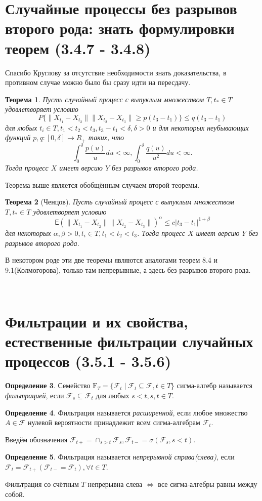 \documentclass[16pt]{article}
\newtheorem{theorem}{Теорема}[section]
\theoremstyle{definition}
\newtheorem{definition}[theorem]{Определение}
\begin{document}
\section{Случайные процессы без разрывов второго рода: знать формулировки теорем (3.4.7
- 3.4.8)}
Спасибо Круглову за отсутствие необходимости знать доказательства, в противном случае можно было бы сразу идти на пересдачу. 
\begin{theorem}
Пусть случайный процесс с выпуклым множеством $T, t_* \in T$ удовлетворяет условию $$P\{\|X_{t_1} - X_{t_2}\|\|X_{t_2} - X_{t_3}\| \ge p(t_3 - t_1)\} \le q(t_3 - t_1)$$ для любых $t_i \in T, t_1 < t_2 < t_3, t_3 - t_1 < \delta, \delta > 0$ и для некоторых неубывающих функций $p,q: [0, \delta] \rightarrow R_+$ таких, что $$\int_0^\delta \frac{p(u)}{u} du < \infty, \int_0^\delta \frac{q(u)}{u^2} du < \infty.$$ Тогда процесс $X$ имеет версию $Y$ без разрывов второго рода.
\end{theorem}
Теорема выше является обобщённым случаем второй теоремы.
\begin{theorem}[Ченцов]
Пусть случайный процесс с выпуклым множеством $T, t_* \in T$ удовлетворяет условию $$\mathsf{E}(\|X_{t_1} - X_{t_2}\|\|X_{t_2} - X_{t_3}\|)^\alpha \le c|t_3 - t_1|^{1 + \beta}$$ для некоторых $\alpha, \beta > 0, t_i \in T, t_1 < t_2 < t_3$. Тогда процесс $X$ имеет версию $Y$ без разрывов второго рода. 
\end{theorem}
В некотором роде эти две теоремы являются аналогами теорем 8.4 и 9.1(Колмогорова), только там непрерывные, а здесь без разрывов второго рода.

\

\section{Фильтрации и их свойства, естественные фильтрации случайных процессов (3.5.1
- 3.5.6)}
\begin{definition}
Семейство $\mathrm{F}_T = \{\mathcal{F}_t \mid \mathcal{F}_t \subseteq \mathcal{F}, t \in T\}$ сигма-алгебр называется \textit{фильтрацией}, если $\mathcal{F}_s \subseteq \mathcal{F}_t$ для любых $s < t, s, t \in T$.
\end{definition}
\begin{definition}
Фильтрация называется \textit{расширенной}, если любое множество $A \in \mathcal{F}$ нулевой вероятности принадлежит всем сигма-алгебрам $\mathcal{F}_t$.
\end{definition}

Введём обозначения $\mathcal{F}_{t+} = \cap_{s > t} \mathcal{F}_s, \mathcal{F}_{t-} = \sigma(\mathcal{F}_s, s < t)$.
\begin{definition}
Фильтрация называется \textit{непрерывной справа(слева)}, если $\mathcal{F}_t = \mathcal{F}_{t+} (\mathcal{F}_{t-} = \mathcal{F}_t), \forall t \in T$.
\end{definition}
Фильтрация со счётным $T$ непрерывна слева $\Longleftrightarrow$ все сигма-алгебры равны между собой.
\end{document}
